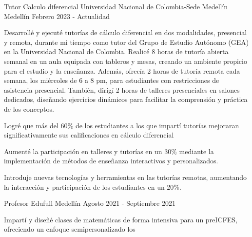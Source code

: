 \newcommand{\quotes}[1]{``#1''}

\begin{cventries}

\cventry
{Tutor Calculo diferencial} %
{Universidad Nacional de Colombia-Sede Medellín} %
{Medellín} %
{Febrero 2023 - Actualidad} %
{
  \begin{cvitems} %
    \item {Desarrollé y ejecuté tutorías de cálculo diferencial en dos modalidades, presencial y remota, durante mi tiempo como tutor
    del Grupo de Estudio Autónomo (GEA) en la Universidad Nacional de Colombia. Realicé 8 horas de tutoría abierta semanal
    en un aula equipada con tableros y mesas, creando un ambiente propicio para el estudio y la enseñanza. Además, ofrecía 2
    horas de tutoría remota cada semana, los miércoles de 6 a 8 pm, para estudiantes con restricciones de asistencia
    presencial. También, dirigí 2 horas de talleres presenciales en salones dedicados, diseñando ejercicios dinámicos para
    facilitar la comprensión y práctica de los conceptos.}
    \item {Logré que más del 60\% de los estudiantes a los que impartí tutorías mejoraran significativamente sus calificaciones en
    cálculo diferencial}
    \item {Aumenté la participación en talleres y tutorías en un 30\% mediante la implementación de métodos de enseñanza
    interactivos y personalizados.}
    \item {Introduje nuevas tecnologías y herramientas en las tutorías remotas, aumentando la interacción y participación de los
    estudiantes en un 20\%.}
  \end{cvitems}
}
\cventry
{Profesor} %
{Edufull} %
{Medellín} %
{Agosto 2021 - Septiembre 2021} %
{
  \begin{cvitems} %
    \item {Impartí y diseñé clases de matemáticas de forma intensiva para un preICFES, ofreciendo un enfoque semipersonalizado los
}
\end{cvitems}}
\end{cventries}
